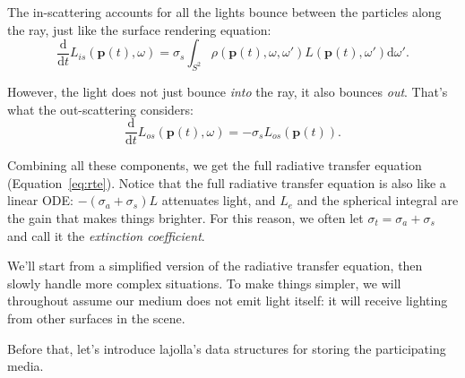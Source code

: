 The in-scattering accounts for all the lights bounce between the particles along the ray, just like the surface rendering equation:
\begin{equation}
\frac{\mathrm{d}}{\mathrm{d}t} L_{is}(\mathbf{p}(t), \omega) = \sigma_s \int_{S^2} \rho(\mathbf{p}(t), \omega, \omega') L(\mathbf{p}(t), \omega') \mathrm{d}\omega'.
\end{equation}

However, the light does not just bounce \emph{into} the ray, it also bounces \emph{out}. That's what the out-scattering considers:
\begin{equation}
\frac{\mathrm{d}}{\mathrm{d}t} L_{os}(\mathbf{p}(t), \omega) = -\sigma_s L_{os}(\mathbf{p}(t)).
\end{equation}

Combining all these components, we get the full radiative transfer equation (Equation~\ref{eq:rte}). Notice that the full radiative transfer equation is also like a linear ODE: $-(\sigma_a + \sigma_s) L$ attenuates light, and $L_e$ and the spherical integral are the gain that makes things brighter. For this reason, we often let $\sigma_t = \sigma_a + \sigma_s$ and call it the \emph{extinction coefficient}.

We'll start from a simplified version of the radiative transfer equation, then slowly handle more complex situations. To make things simpler, we will throughout assume our medium does not emit light itself: it will receive lighting from other surfaces in the scene.

Before that, let's introduce lajolla's data structures for storing the participating media.

